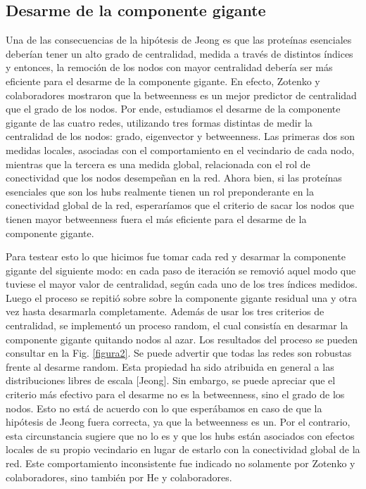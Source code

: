 \documentclass[%
 reprint,
 amsmath,amssymb,
 aps,
]{revtex4-1}
\begin{document}
\subsection{Desarme de la componente gigante}

Una de las consecuencias de la hip\'otesis de Jeong es que las prote\'inas esenciales deber\'ian tener un alto grado de centralidad, medida a trav\'es de distintos \'indices y entonces, la remoci\'on de los nodos con mayor centralidad deber\'ia ser m\'as eficiente para el desarme de la componente gigante. En efecto, Zotenko y colaboradores mostraron que la betweenness es un mejor predictor de centralidad que el grado de los nodos. Por ende, estudiamos el desarme de la componente gigante de las cuatro redes, utilizando tres formas distintas de medir la centralidad de los nodos: grado, eigenvector y betweenness. Las primeras dos son medidas locales, asociadas con el comportamiento en el vecindario de cada nodo, mientras que la tercera es una medida global, relacionada con el rol de conectividad que los nodos desempe\~nan en la red. Ahora bien, si las prote\'inas esenciales que son los hubs realmente tienen un rol preponderante en la conectividad global de la red, esperar\'iamos que el criterio de sacar los nodos que tienen mayor betweenness fuera el m\'as eficiente para el desarme de la componente gigante.

Para testear esto lo que hicimos fue tomar cada red y desarmar la componente gigante del siguiente modo: en cada paso de iteraci\'on se removi\'o aquel modo que tuviese el mayor valor de centralidad, seg\'un cada uno de los tres \'indices medidos. Luego el proceso se repiti\'o sobre sobre la componente gigante residual una y otra vez hasta desarmarla completamente. Adem\'as de usar los tres criterios de centralidad, se implement\'o un proceso random, el cual consist\'ia en desarmar la componente gigante quitando nodos al azar. Los resultados del proceso se pueden consultar en la Fig. \ref{figura2}. Se puede advertir que todas las redes son robustas frente al desarme random. Esta propiedad ha sido atribuida en general a las distribuciones libres de escala [Jeong]. Sin embargo, se puede apreciar que el criterio m\'as efectivo para el desarme no es la betweenness, sino el grado de los nodos. Esto no est\'a de acuerdo con lo que esper\'abamos en caso de que la hip\'otesis de Jeong fuera correcta, ya que la betweenness es un. Por el contrario, esta circunstancia sugiere que no lo es y que los hubs est\'an asociados con efectos locales de su propio vecindario en lugar de estarlo con la conectividad global de la red. Este comportamiento inconsistente fue indicado no solamente por Zotenko y colaboradores, sino tambi\'en por He y colaboradores.
\end{document}
